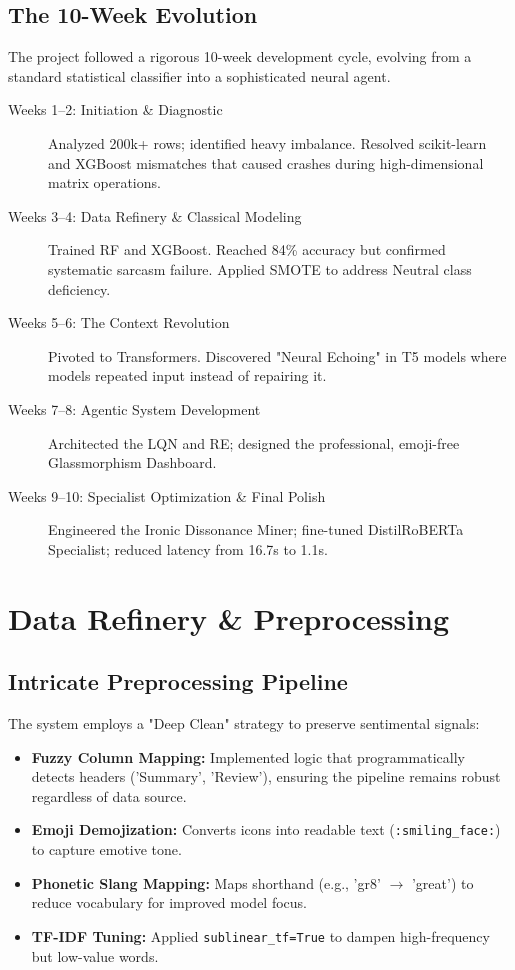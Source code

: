 \documentclass[11pt,oneside]{scrbook}
\begin{document}
\section{The 10-Week Evolution}
The project followed a rigorous 10-week development cycle, evolving from a standard statistical classifier into a sophisticated neural agent.
\begin{description}
    \item[Weeks 1--2: Initiation \& Diagnostic] Analyzed 200k+ rows; identified heavy imbalance. Resolved scikit-learn and XGBoost mismatches that caused crashes during high-dimensional matrix operations.
    \item[Weeks 3--4: Data Refinery \& Classical Modeling] Trained RF and XGBoost. Reached 84\% accuracy but confirmed systematic sarcasm failure. Applied SMOTE to address Neutral class deficiency.
    \item[Weeks 5--6: The Context Revolution] Pivoted to Transformers. Discovered "Neural Echoing" in T5 models where models repeated input instead of repairing it.
    \item[Weeks 7--8: Agentic System Development] Architected the LQN and RE; designed the professional, emoji-free Glassmorphism Dashboard.
    \item[Weeks 9--10: Specialist Optimization \& Final Polish] Engineered the Ironic Dissonance Miner; fine-tuned DistilRoBERTa Specialist; reduced latency from 16.7s to 1.1s.
\end{description}

\cleardoublepage
\chapter{Data Refinery \& Preprocessing}

\section{Intricate Preprocessing Pipeline}
The system employs a "Deep Clean" strategy to preserve sentimental signals:
\begin{itemize}
    \item \textbf{Fuzzy Column Mapping:} Implemented logic that programmatically detects headers ('Summary', 'Review'), ensuring the pipeline remains robust regardless of data source.
    \item \textbf{Emoji Demojization:} Converts icons into readable text (\texttt{:smiling\_face:}) to capture emotive tone.
    \item \textbf{Phonetic Slang Mapping:} Maps shorthand (e.g., 'gr8' $\to$ 'great') to reduce vocabulary for improved model focus.
    \item \textbf{TF-IDF Tuning:} Applied \texttt{sublinear\_tf=True} to dampen high-frequency but low-value words.
\end{itemize}
\end{document}
